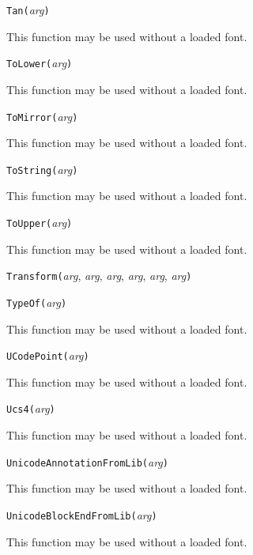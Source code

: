 \noindent\texttt{Tan(}\textit{arg}\texttt{)}

This function may be used without a loaded font.


\noindent\texttt{ToLower(}\textit{arg}\texttt{)}

This function may be used without a loaded font.


\noindent\texttt{ToMirror(}\textit{arg}\texttt{)}

This function may be used without a loaded font.


\noindent\texttt{ToString(}\textit{arg}\texttt{)}

This function may be used without a loaded font.


\noindent\texttt{ToUpper(}\textit{arg}\texttt{)}

This function may be used without a loaded font.


\noindent\texttt{Transform(}\textit{arg}, \textit{arg}, \textit{arg}, \textit{arg}, \textit{arg}, \textit{arg}\texttt{)}


\noindent\texttt{TypeOf(}\textit{arg}\texttt{)}

This function may be used without a loaded font.


\noindent\texttt{UCodePoint(}\textit{arg}\texttt{)}

This function may be used without a loaded font.


\noindent\texttt{Ucs4(}\textit{arg}\texttt{)}

This function may be used without a loaded font.


\noindent\texttt{UnicodeAnnotationFromLib(}\textit{arg}\texttt{)}

This function may be used without a loaded font.


\noindent\texttt{UnicodeBlockEndFromLib(}\textit{arg}\texttt{)}

This function may be used without a loaded font.

